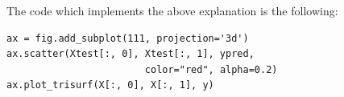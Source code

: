 \documentclass[10pt]{article}
\begin{document}
The code which implements the above explanation is the following:
\begin{lstlisting}
ax = fig.add_subplot(111, projection='3d')
ax.scatter(Xtest[:, 0], Xtest[:, 1], ypred,
                        color="red", alpha=0.2)
ax.plot_trisurf(X[:, 0], X[:, 1], y)
\end{lstlisting}
\begin{figure}[H]       

\end{figure}
\end{document}
